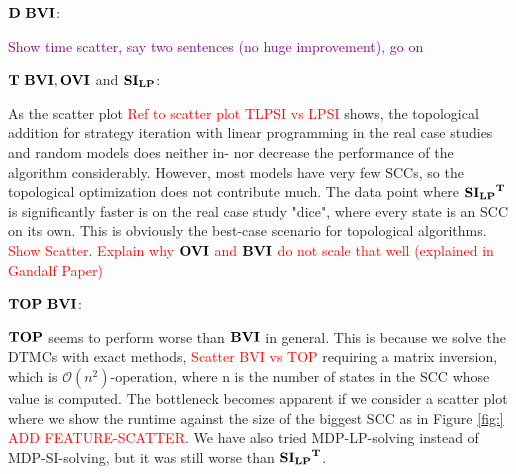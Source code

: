 $\mathbf{D} \ \mathbf{BVI}$:

\textcolor{purple}{Show time scatter, say two sentences (no huge improvement), go on}

$\mathbf{T} \ \mathbf{BVI}, \mathbf{OVI}$ and $\mathbf{SI_{LP}}$:

As the scatter plot \textcolor{red}{Ref to scatter plot TLPSI vs LPSI} shows,
the topological addition for strategy iteration with linear programming in the real case studies and random models does 
neither in- nor decrease the performance of the algorithm considerably.
However, most models have very few SCCs, so the topological optimization does not contribute much.
The data point where $\mathbf{\mathbf{SI_{LP}}^T}$ is significantly faster is on the real case study "dice", where every state is an SCC on its own.
This is obviously the best-case scenario for topological algorithms.
\textcolor{red}{Show Scatter.
Explain why $\mathbf{OVI}$ and $\mathbf{BVI}$ do not scale that well (explained in Gandalf Paper)}

$\mathbf{TOP} \ \mathbf{BVI}$:

$\mathbf{TOP}$ seems to perform worse than $\mathbf{BVI}$ in general. This is because we solve the DTMCs with exact methods, 
\textcolor{red}{Scatter BVI vs TOP}
requiring a matrix inversion, which is $\mathcal{O}(n^{2})$-operation, where n is the number of states in the SCC whose value is computed.
The bottleneck becomes apparent if we consider a scatter plot where we show the runtime against the size of the biggest SCC as in Figure \ref{fig:} \textcolor{red}{ADD FEATURE-SCATTER}.
We have also tried MDP-LP-solving instead of MDP-SI-solving, but it was still worse than $\mathbf{\mathbf{SI_{LP}}^T}$.


